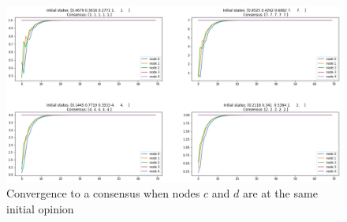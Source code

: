 \documentclass[
	12pt, %
]{fphw}
\begin{document}
\begin{enumerate}[(a\normalfont)]
    \begin{figure}[H]
        \centering
    	\includegraphics[width=0.8\columnwidth]{P1Hconverge.png} 
    	\caption{Convergence to a consensus when nodes $c$ and $d$ are at the same initial opinion}
    	\label{fig:P1Hconverge}
    \end{figure}
\end{enumerate}
\end{document}

